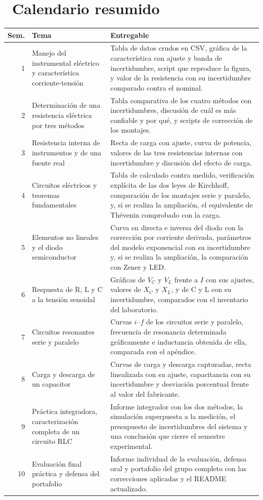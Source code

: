 \documentclass[11pt,a4paper]{article}
\newcommand{\iconotexto}[2]{\textcolor{cyanNeon}{\faIcon{#1}}~#2}
\begin{document}
\section{\iconotexto{calendar-alt}{Calendario resumido}}

\begin{tabularx}{\linewidth}{@{}r p{4.1cm} X@{}}
\toprule
Sem. & Tema & Entregable\\
\midrule
1 & Manejo del instrumental eléctrico y característica corriente-tensión & Tabla de datos crudos en CSV, gráfica de la característica con ajuste y banda de incertidumbre, script que reproduce la figura, y valor de la resistencia con su incertidumbre comparado contra el nominal. \\
2 & Determinación de una resistencia eléctrica por tres métodos & Tabla comparativa de los cuatro métodos con incertidumbres, discusión de cuál es más confiable y por qué, y scripts de corrección de los montajes. \\
3 & Resistencia interna de instrumentos y de una fuente real & Recta de carga con ajuste, curva de potencia, valores de las tres resistencias internas con incertidumbre y discusión del efecto de carga. \\
4 & Circuitos eléctricos y teoremas fundamentales & Tabla de calculado contra medido, verificación explícita de las dos leyes de Kirchhoff, comparación de los montajes serie y paralelo, y, si se realiza la ampliación, el equivalente de Thévenin comprobado con la carga. \\
5 & Elementos no lineales y el diodo semiconductor & Curva en directa e inversa del diodo con la corrección por corriente derivada, parámetros del modelo exponencial con su incertidumbre y, si se realiza la ampliación, la comparación con Zener y LED. \\
6 & Respuesta de R, L y C a la tensión senoidal & Gráficas de $V_C$ y $V_L$ frente a $I$ con sus ajustes, valores de $X_C$ y $X_L$, y de C y L con su incertidumbre, comparados con el inventario del laboratorio. \\
7 & Circuitos resonantes serie y paralelo & Curvas $i$--$f$ de los circuitos serie y paralelo, frecuencia de resonancia determinada gráficamente e inductancia obtenida de ella, comparada con el apéndice. \\
8 & Carga y descarga de un capacitor & Curvas de carga y descarga capturadas, recta linealizada con su ajuste, capacitancia con su incertidumbre y desviación porcentual frente al valor del fabricante. \\
9 & Práctica integradora, caracterización completa de un circuito RLC & Informe integrador con los dos métodos, la simulación superpuesta a la medición, el presupuesto de incertidumbres del sistema y una conclusión que cierre el semestre experimental. \\
10 & Evaluación final práctica y defensa del portafolio & Informe individual de la evaluación, defensa oral y portafolio del grupo completo con las correcciones aplicadas y el README actualizado. \\
\bottomrule
\end{tabularx}
\end{document}
